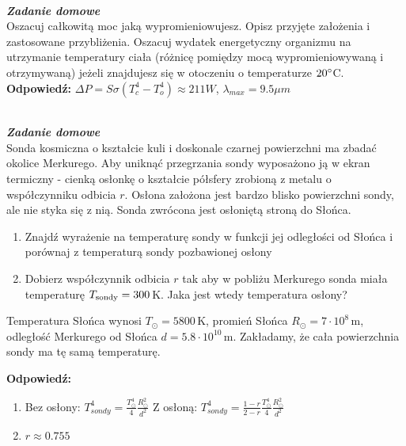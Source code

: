 \documentclass[11pt,a4paper]{article}
\newcounter{zaddom}\newcommand{\zaddom}[1][]{\addtocounter{zaddom}{1} ~\\  {\bf \emph{Zadanie domowe \arabic{zaddom} #1 }} \\}
\begin{document}
\newpage

\zaddom
Oszacuj całkowitą moc jaką wypromieniowujesz. Opisz przyjęte założenia i zastosowane przybliżenia. Oszacuj
wydatek energetyczny organizmu na utrzymanie temperatury ciała (różnicę pomiędzy mocą wypromieniowywaną
i otrzymywaną) jeżeli znajdujesz się w otoczeniu o temperaturze $20\degree$C.
\vskip 10pt
\textbf{Odpowiedź:}
$\Delta P = S \sigma (T_c^4-T_o^4) \approx 211 W$, $\lambda_{max} = 9.5 \mu m$

\zaddom
Sonda kosmiczna o kształcie kuli i doskonale czarnej powierzchni ma zbadać okolice Merkurego. Aby uniknąć
przegrzania sondy wyposażono ją w ekran termiczny - cienką osłonkę o kształcie półsfery zrobioną z metalu
o współczynniku odbicia $r$. Osłona założona jest bardzo blisko powierzchni sondy, ale nie styka się z nią. Sonda
zwrócona jest osłoniętą stroną do Słońca.
\begin{enumerate}
\item Znajdź wyrażenie na temperaturę sondy w funkcji jej odległości od Słońca i porównaj z temperaturą sondy
pozbawionej osłony
\item Dobierz współczynnik odbicia $r$ tak aby w pobliżu Merkurego sonda miała temperaturę $T_{\rm sondy}= 300$\,K. 
Jaka jest wtedy temperatura osłony?
\end{enumerate}
Temperatura Słońca wynosi $T_\odot= 5800$\,K, promień Słońca $R_\odot = 7 \cdot 10^8$\,m, 
odległość Merkurego od Słońca $d = 5.8 \cdot 10^{10}$\,m. 
Zakładamy, że cała powierzchnia sondy ma tę samą temperaturę.

\vskip 10pt
\textbf{Odpowiedź:}
\begin{enumerate}
\item Bez osłony: $T_{sondy}^4 = \frac{T_\odot^4}{4} \frac{R_\odot^2}{d^2}$
Z osłoną: $T_{sondy}^4 = \frac{1-r}{2-r} \frac{T_\odot^4}{4} \frac{R_\odot^2}{d^2}$
\item $r \approx 0.755$
\end{enumerate}
\end{document}
